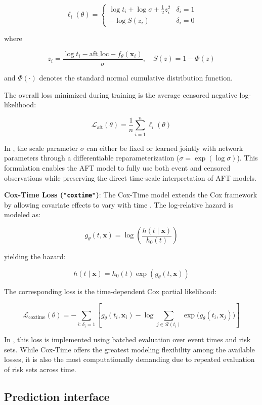 \[
\ell_i(\theta) =
\begin{cases}
\log t_i + \log \sigma + \tfrac{1}{2} z_i^2 & \delta_i = 1 \\
-\log S(z_i) & \delta_i = 0
\end{cases}
\]

where

\[
z_i = \frac{\log t_i - \mathrm{aft\_loc} - f_\theta(\mathbf{x}_i)}{\sigma},
\quad
S(z) = 1 - \Phi(z)
\]

and \(\Phi(\cdot)\) denotes the standard normal cumulative distribution function.

The overall loss minimized during training is the average censored negative log-likelihood:

\[
\mathcal{L}_{\text{aft}}(\theta) = \frac{1}{n} \sum_{i=1}^n \ell_i(\theta)
\]

In , the scale parameter \(\sigma\) can either be fixed or learned jointly with network parameters through a differentiable reparameterization (\(\sigma = \exp(\log\sigma)\)). This formulation enables the AFT model to fully use both event and censored observations while preserving the direct time-scale interpretation of AFT models.

\textbf{Cox-Time Loss (\texttt{"coxtime"})}: The Cox-Time model extends the Cox framework by allowing covariate effects to vary with time \citep{kvamme2019time}. The log-relative hazard is modeled as:

\[
g_\theta(t,\mathbf{x})
=
\log\!\left(\frac{h(t \mid \mathbf{x})}{h_0(t)}\right)
\]

yielding the hazard:

\[
h(t\mid\mathbf{x}) = h_0(t)\exp(g_\theta(t,\mathbf{x}))
\]

The corresponding loss is the time-dependent Cox partial likelihood:

\[
\mathcal{L}_{\text{coxtime}}(\theta)
= - \sum_{i:\,\delta_i = 1}
\left[
g_\theta(t_i, \mathbf{x}_i)
-
\log \sum_{j \in \mathcal{R}(t_i)}
\exp\!\bigl(g_\theta(t_i, \mathbf{x}_j)\bigr)
\right]
\]

In , this loss is implemented using batched evaluation over event times and risk sets. While Cox-Time offers the greatest modeling flexibility among the available losses, it is also the most computationally demanding due to repeated evaluation of risk sets across time.

\subsection{Prediction interface}\label{prediction-interface}

